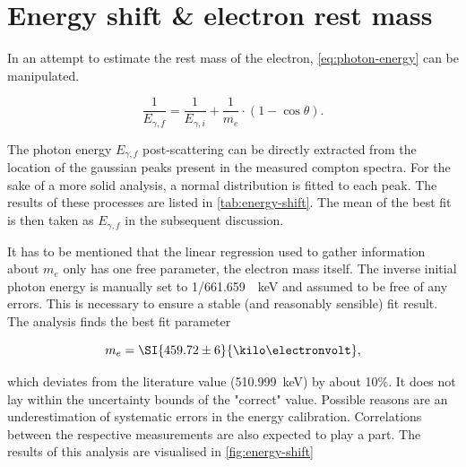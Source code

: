 
\section{Energy shift \& electron rest mass}
\label{sec:energy-shift}

In an attempt to estimate the rest mass of the electron, \autoref{eq:photon-energy} 
can be manipulated.

\begin{equation}
\label{eq:linear-regression}
\frac{1}{E_{\gamma,f}} = \frac{1}{E_{\gamma,i}} + \frac{1}{m_e}\cdot\left(1-\cos\theta\right).
\end{equation}

The photon energy $E_{\gamma,f}$ post-scattering can be directly extracted from the 
location of the gaussian peaks present in the measured compton spectra. For the sake
of a more solid analysis, a normal distribution is fitted to each peak. The results
of these processes are listed in \autoref{tab:energy-shift}. The mean of the best fit
is then taken as $E_{\gamma,f}$ in the subsequent discussion.



It has to be mentioned that the linear regression used to gather information about 
$m_e$ only has one free parameter, the electron mass itself. The inverse initial
photon energy is manually set to \SI{1/661.659}{\per\kilo\electronvolt} and assumed 
to be free of any errors. This is necessary to ensure a stable (and reasonably 
sensible) fit result. The analysis finds the best fit parameter

\begin{equation}
\label{eq:electron-mass-estimate}
	m_e = \SI{459.72 \pm 6}{\kilo\electronvolt},
\end{equation}

which deviates from the literature value (\SI{510.999}{\kilo\electronvolt}) by about
10\%. It does not lay within the uncertainty bounds of the "correct" value. Possible
reasons are an underestimation of systematic errors in the energy calibration.
Correlations between the respective measurements are also expected to play a part.
The results of this analysis are visualised in \autoref{fig:energy-shift}

